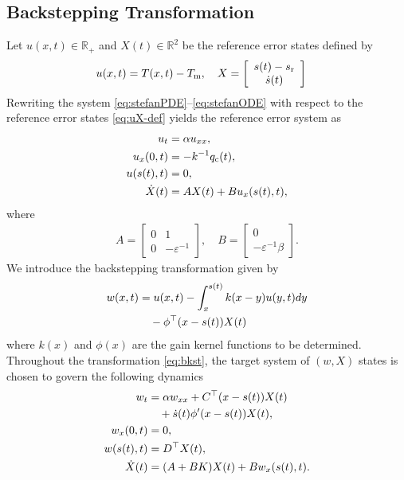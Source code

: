 \documentclass[letterpaper, 10 pt, conference]{cls/ieeeconf}
\theoremstyle{definition}
\newcommand{\ep}{\varepsilon}
\newcommand{\bbR}{\mathbb{R}}
\begin{document}
\subsection{Backstepping Transformation}
Let $u(x,t) \in \bbR_+$ and $X(t) \in \bbR^2$ be the reference error states defined by
\begin{align} \label{eq:uX-def}
    u(x,t) &= T(x,t) - T_{\rm m}, \quad 
    X = 
    \left[
    \begin{array}{cc}
    s(t) - s_{\rm r} \\
     \dot s(t) 
    \end{array}
    \right]
\end{align}
Rewriting the system \eqref{eq:stefanPDE}--\eqref{eq:stefanODE} with respect to the reference error states \eqref{eq:uX-def} yields the reference error system as 
\begin{align} \label{eq:u-PDE}
    u_t &= \alpha u_{xx} , \\
\label{eq:u-BC1}  u_x(0,t) & = - k^{-1} q_{\rm c}(t) , \\
  \label{eq:u-BC2}  u(s(t),t) & = 0, \\
 \label{eq:u-ODE} \dot X(t) & = AX(t) + B u_x(s(t),t),  
\end{align}
where 
\begin{align}
    A = \left [
    \begin{array}{cc}
       0  & 1 \\
       0  & - \ep^{-1}
    \end{array}
    \right] , \quad 
    B =\left [
    \begin{array}{c}
       0  \\
       - \ep^{-1} \beta
    \end{array}
    \right]  . 
\end{align}
We introduce the backstepping transformation given by 
\begin{align}
    w(x,t) & = u(x,t) -  \int_x^{s(t)} k(x - y) u(y,t) dy \notag\\
    & \quad - \phi^\top (x-s(t)) X(t) \label{eq:bkst}
\end{align}
where $k(x)$ and $\phi(x)$ are the gain kernel functions to be determined. Throughout the transformation \eqref{eq:bkst}, the target system of $(w,X)$ states is chosen to govern the following dynamics 
\begin{align} 
    w_t &= \alpha w_{xx} + C^\top(x-s(t)) X(t) \notag\\
    & \quad + \dot s(t) \phi'(x-s(t)) X(t), \label{eq:w-PDE} \\
  w_x(0,t) & = 0 , \label{eq:w-BC1} \\
    w(s(t),t) & = D^\top X(t), \label{eq:w-BC2}\\
    \dot X(t) & = (A + BK) X(t) + B w_x(s(t),t). \label{eq:w-ODE}
\end{align} 
\end{document}
